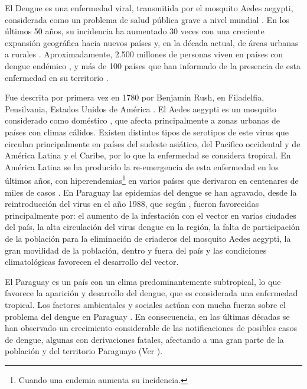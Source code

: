 
El Dengue es una enfermedad viral, transmitida por el mosquito Aedes aegypti, considerada como
un problema de salud pública grave a nivel mundial
\citep{dengueUruguayCap1, world2009dengue, DIBO2005}. En los últimos 50 años, su incidencia ha
aumentado 30 veces con una creciente expansión geográfica hacia nuevos países y, en la década actual, de áreas urbanas a rurales \cite{world2009dengue}. Aproximadamente, 2.500 millones de
personas viven en países con dengue endémico \cite{world2009dengue, gustavo2006dengue}, y más de
100 países que han informado de la presencia de esta enfermedad en su territorio
\cite{gustavo2006dengue}.

Fue descrita por primera vez en 1780 por Benjamin Rush, en Filadelfia, Pensilvania, Estados Unidos
de América \citep{gustavo2006dengue}. El Aedes aegypti es un mosquito considerado como doméstico
\cite{luevano1993ciclo}, que afecta principalmente a zonas urbanas de países con climas cálidos.
Existen distintos tipos de serotipos de este virus que circulan principalmente en países del
sudeste asiático, del Pacifico occidental y de América Latina y el Caribe, por lo que la
enfermedad se considera tropical\citep{gustavo2006dengue}. En América Latina se ha producido la
re-emergencia de esta enfermedad en los últimos años, con hiperendemias\footnote{Cuando una
endemia aumenta su incidencia.} en varios países que derivaron en centenares de miles de casos
\cite{dengueUruguayCap1}. En Paraguay las epidemias del dengue se han agravado, desde la
reintroducción del virus en el año 1988, que según \cite{planControlMspbs2014}, fueron favorecidas
principalmente por: el aumento de la infestación con el vector en varias ciudades del país, la
alta circulación del virus dengue en la región, la falta de participación de la población para la
eliminación de criaderos del mosquito Aedes aegypti, la gran movilidad de la población, dentro y
fuera del país y las condiciones climatológicas favorecen el desarrollo del vector.

El Paraguay es un país con un clima predominantemente subtropical, lo que favorece la aparición y
desarrollo del dengue, que es considerada una enfermedad tropical\cite{gustavo2006dengue,DIBO2005}.
Los factores ambientales y sociales actúan con mucha fuerza sobre el problema del dengue en
Paraguay \cite{website:mspbsHistoria2014}. En consecuencia, en las últimas décadas se han
observado un crecimiento considerable de las notificaciones de posibles casos de dengue, algunas
con derivaciones fatales, afectando a una gran parte de la población y del territorio Paraguayo
(Ver ).

